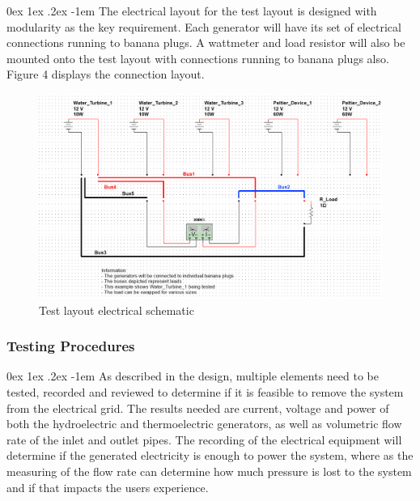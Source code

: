 \documentclass[12pt, a4paper]{article}
\makeatletter
\renewcommand\paragraph{\@startsection{paragraph}{5}{\parindent}%
  {0ex \@plus1ex \@minus.2ex}%
  {-1em}%
  {\normalfont\normalsize\bfseries}}
\makeatother
\begin{document}
                \paragraph{}
                    The electrical layout for the test layout is designed with modularity as the key requirement. Each generator will have its set of electrical 
                    connections running to banana plugs. A wattmeter and load resistor will also be mounted onto the test layout with connections running to banana 
                    plugs also. Figure 4 displays the connection layout.
                    \begin{figure}[H]
                        \centering
                        \includegraphics[width=0.8\linewidth]{img/circuitDiagram1.png}
                        \caption{Test layout electrical schematic}
                    \end{figure}
            \subsubsection{Testing Procedures}
                \paragraph{}
                    As described in the design, multiple elements need to  be tested, recorded and reviewed to determine if it is feasible to remove the system 
                    from the electrical grid. The results needed are current, voltage and power of both the hydroelectric and thermoelectric generators, as well 
                    as volumetric flow rate of the inlet and outlet pipes. The recording of the electrical equipment will determine if the generated electricity 
                    is enough to power the system, where as the measuring of the flow rate can determine how much pressure is lost to the system and if that 
                    impacts the users experience.
\end{document}
